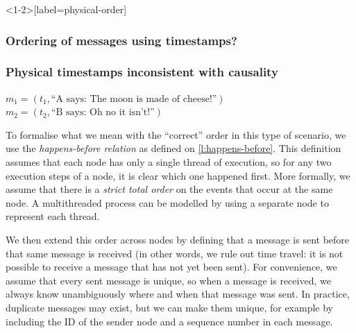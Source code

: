 \begin{frame}<1-2>[label=physical-order]
    \label{s:physical-order}
    \frametitle<1-2>{Ordering of messages using timestamps?}
    \frametitle<3>{Physical timestamps inconsistent with causality}
    \begin{center}
    \end{center}
    $m_1 = (t_1, \text{``A says: The moon is made of cheese!''})$\\
    $m_2 = (t_2, \text{``B says: Oh no it isn't!''})$\\[1em]%
\end{frame}
\label{l:physical-order}

To formalise what we mean with the ``correct'' order in this type of scenario, we use the \emph{happens-before relation} as defined on \autoref{l:happens-before}.
This definition assumes that each node has only a single thread of execution, so for any two execution steps of a node, it is clear which one happened first.
More formally, we assume that there is a \emph{strict total order} on the events that occur at the same node.
A multithreaded process can be modelled by using a separate node to represent each thread.

We then extend this order across nodes by defining that a message is sent before that same message is received (in other words, we rule out time travel: it is not possible to receive a message that has not yet been sent).
For convenience, we assume that every sent message is unique, so when a message is received, we always know unambiguously where and when that message was sent.
In practice, duplicate messages may exist, but we can make them unique, for example by including the ID of the sender node and a sequence number in each message.


